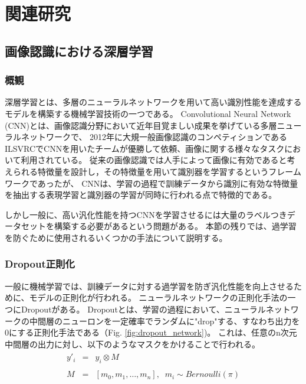 \chapter{関連研究}

\section{画像認識における深層学習}
\subsection{概観}
深層学習とは、多層のニューラルネットワークを用いて高い識別性能を達成するモデルを構築する機械学習技術の一つである。
Convolutional Neural Network (CNN)とは、画像認識分野において近年目覚ましい成果を挙げている多層ニューラルネットワークで、
2012年に大規一般画像認識のコンペティションであるILSVRCでCNNを用いたチームが優勝して依頼、画像に関する様々なタスクにおいて利用されている。
従来の画像認識では人手によって画像に有効であると考えられる特徴量を設計し，その特徴量を用いて識別器を学習するというフレームワークであったが、
CNNは、学習の過程で訓練データから識別に有効な特徴量を抽出する表現学習と識別器の学習が同時に行われる点で特徴的である。

しかし一般に、高い汎化性能を持つCNNを学習させるには大量のラベルつきデータセットを構築する必要があるという問題がある。
本節の残りでは、過学習を防ぐために使用されるいくつかの手法について説明する。

\subsection{Dropout正則化}
一般に機械学習では、訓練データに対する過学習を防ぎ汎化性能を向上させるために、モデルの正則化が行われる。
ニューラルネットワークの正則化手法の一つにDropout\cite{hinton2012improving, srivastava2014dropout}がある。
Dropoutとは、学習の過程において、ニューラルネットワークの中間層のニューロンを一定確率でランダムに"drop"する、すなわち出力を0にする正則化手法である（Fig. \ref{fig:dropout_network})。
これは、任意のn次元中間層の出力に対し、以下のようなマスクをかけることで行われる。
\begin{eqnarray}
    \begin{split}
        y'_i &=& y_i \otimes M \\
        \\
        M &=& [m_0, m_1, \dots, m_n],\;\; m_i \sim Bernoulli(\pi) 
    \end{split}
\end{eqnarray}

